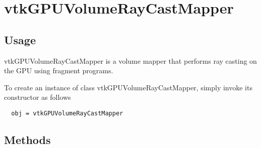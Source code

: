 \section{vtkGPUVolumeRayCastMapper}

\subsection{Usage}

 vtkGPUVolumeRayCastMapper is a volume mapper that performs ray casting on
 the GPU using fragment programs.


To create an instance of class vtkGPUVolumeRayCastMapper, simply
invoke its constructor as follows
\begin{verbatim}
  obj = vtkGPUVolumeRayCastMapper
\end{verbatim}
\subsection{Methods}


